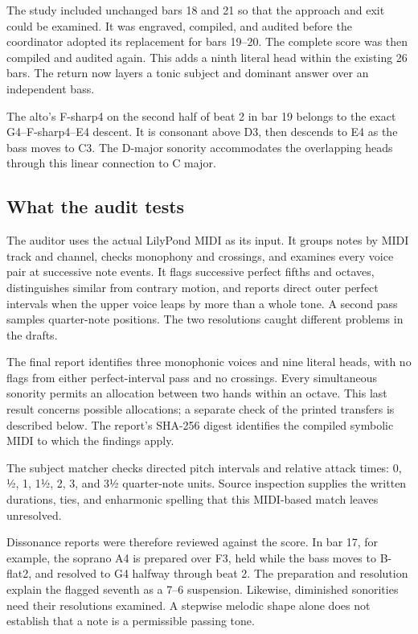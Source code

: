 \documentclass[11pt,a4paper]{article}
\begin{document}
The study included unchanged bars 18 and 21 so that the approach and exit could be examined. It was engraved, compiled, and audited before the coordinator adopted its replacement for bars 19--20. The complete score was then compiled and audited again. This adds a ninth literal head within the existing 26 bars. The return now layers a tonic subject and dominant answer over an independent bass.

The alto's F-sharp4 on the second half of beat 2 in bar 19 belongs to the exact G4--F-sharp4--E4 descent. It is consonant above D3, then descends to E4 as the bass moves to C3. The D-major sonority accommodates the overlapping heads through this linear connection to C major.

\subsection{What the audit tests}\label{what-the-audit-tests}

The auditor uses the actual LilyPond MIDI as its input. It groups notes by MIDI track and channel, checks monophony and crossings, and examines every voice pair at successive note events. It flags successive perfect fifths and octaves, distinguishes similar from contrary motion, and reports direct outer perfect intervals when the upper voice leaps by more than a whole tone. A second pass samples quarter-note positions. The two resolutions caught different problems in the drafts.

The final report identifies three monophonic voices and nine literal heads, with no flags from either perfect-interval pass and no crossings. Every simultaneous sonority permits an allocation between two hands within an octave. This last result concerns possible allocations; a separate check of the printed transfers is described below. The report's SHA-256 digest identifies the compiled symbolic MIDI to which the findings apply.

The subject matcher checks directed pitch intervals and relative attack times: 0, ½, 1, 1½, 2, 3, and 3½ quarter-note units. Source inspection supplies the written durations, ties, and enharmonic spelling that this MIDI-based match leaves unresolved.

Dissonance reports were therefore reviewed against the score. In bar 17, for example, the soprano A4 is prepared over F3, held while the bass moves to B-flat2, and resolved to G4 halfway through beat 2. The preparation and resolution explain the flagged seventh as a 7--6 suspension. Likewise, diminished sonorities need their resolutions examined. A stepwise melodic shape alone does not establish that a note is a permissible passing tone.
\end{document}
